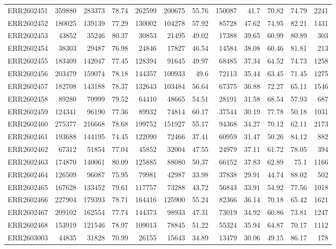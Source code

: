 \documentclass[12pt, oneside]{report}
\begin{document}
\begin{longtable}{@{}p{3.2cm}rrrrrrrrrrr@{}}
ERR2602451 & 359880 & 283373 & 78.74 & 262599 & 200675 & 55.76 & 150087 & 41.7 & 70.82 & 74.79 & 2241 \\
ERR2602452 & 180025 & 139139 & 77.29 & 130002 & 104278 & 57.92 & 85728 & 47.62 & 74.95 & 82.21 & 1431 \\
ERR2602453 & 43852 & 35246 & 80.37 & 30853 & 21495 & 49.02 & 17388 & 39.65 & 60.99 & 80.89 & 303 \\
ERR2602454 & 38303 & 29487 & 76.98 & 24846 & 17827 & 46.54 & 14584 & 38.08 & 60.46 & 81.81 & 213 \\
ERR2602455 & 183409 & 142047 & 77.45 & 128394 & 91645 & 49.97 & 68485 & 37.34 & 64.52 & 74.73 & 1258 \\
ERR2602456 & 203479 & 159074 & 78.18 & 144357 & 100933 & 49.6 & 72113 & 35.44 & 63.45 & 71.45 & 1275 \\
ERR2602457 & 182708 & 143188 & 78.37 & 132643 & 103484 & 56.64 & 67375 & 36.88 & 72.27 & 65.11 & 1546 \\
ERR2602458 & 89280 & 70999 & 79.52 & 64410 & 48665 & 54.51 & 28191 & 31.58 & 68.54 & 57.93 & 687 \\
ERR2602459 & 124341 & 96190 & 77.36 & 89932 & 74814 & 60.17 & 37544 & 30.19 & 77.78 & 50.18 & 1031 \\
ERR2602460 & 275377 & 216668 & 78.68 & 199752 & 151927 & 55.17 & 94368 & 34.27 & 70.12 & 62.11 & 2173 \\
ERR2602461 & 193688 & 144195 & 74.45 & 122090 & 72466 & 37.41 & 60959 & 31.47 & 50.26 & 84.12 & 882 \\
ERR2602462 & 67312 & 51854 & 77.04 & 45852 & 32004 & 47.55 & 24979 & 37.11 & 61.72 & 78.05 & 394 \\
ERR2602463 & 174870 & 140061 & 80.09 & 125885 & 88080 & 50.37 & 66152 & 37.83 & 62.89 & 75.1 & 1166 \\
ERR2602464 & 126509 & 96087 & 75.95 & 79981 & 42987 & 33.98 & 37838 & 29.91 & 44.74 & 88.02 & 502 \\
ERR2602465 & 167628 & 133452 & 79.61 & 117757 & 73288 & 43.72 & 56843 & 33.91 & 54.92 & 77.56 & 1018 \\
ERR2602466 & 227904 & 179393 & 78.71 & 164416 & 125900 & 55.24 & 82366 & 36.14 & 70.18 & 65.42 & 1621 \\
ERR2602467 & 209102 & 162554 & 77.74 & 144373 & 98933 & 47.31 & 73019 & 34.92 & 60.86 & 73.81 & 1247 \\
ERR2602468 & 153919 & 121546 & 78.97 & 109013 & 78845 & 51.22 & 55324 & 35.94 & 64.87 & 70.17 & 1112 \\
ERR2603003 & 44835 & 31828 & 70.99 & 26155 & 15643 & 34.89 & 13479 & 30.06 & 49.15 & 86.17 & 178 \\
\end{longtable}
\endgroup
\newpage
\end{document}
